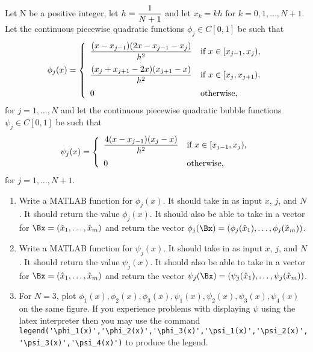
Let N be a positive integer, let $\displaystyle{h={1 \over N+1}}$ and let $x_k=kh$ for $k=0,1,\ldots,N+1$. Let the continuous piecewise quadratic functions $\phi_j\in C[0,1]$ be such that
\[
\phi_j(x)=\left\{\begin{array}{ll}
\displaystyle{{(x-x_{j-1})(2x-x_{j-1}-x_j) \over h^2}} & \displaystyle{\mbox{if }x\in[x_{j-1},x_j)},
\\[10pt]
\displaystyle{{(x_j+x_{j+1}-2x)(x_{j+1}-x) \over h^2}} & \displaystyle{\mbox{if }x\in[x_j,x_{j+1})},
\\[10pt]
0 & \mbox{otherwise},
\end{array}\right.
\]
for $j=1,\ldots,N$ and let the continuous piecewise quadratic bubble functions $\psi_j\in C[0,1]$ be such that
\[
\psi_j(x)=\left\{\begin{array}{ll}
\displaystyle{{4(x-x_{j-1})(x_j-x) \over h^2}} & \displaystyle{\mbox{if }x\in[x_{j-1},x_j)},
\\[10pt]
0 & \mbox{otherwise},
\end{array}\right.
\]
for $j=1,\ldots,N+1$.
\\
\begin{enumerate}
\item Write a MATLAB function for $\phi_j(x)$.  It should take in as input $x$, $j$, and $N$.  It should return the value $\phi_j(x)$.  It should also be able to take in a vector for $\Bx=(\hat{x}_1,\ldots,\hat{x}_m)$ and return the vector $\phi_j(\Bx)=(\phi_j(\hat{x}_1),\ldots,\phi_j(\hat{x}_m))$.
\\
\item Write a MATLAB function for $\psi_j(x)$.  It should take in as input $x$, $j$, and $N$.  It should return the value $\psi_j(x)$.  It should also be able to take in a vector for $\Bx=(\hat{x}_1,\ldots,\hat{x}_m)$ and return the vector $\psi_j(\Bx)=(\psi_j(\hat{x}_1),\ldots,\psi_j(\hat{x}_m))$.
\\
\item For $N=3$, plot $\phi_1(x),\phi_2(x), \phi_3(x),\psi_1(x),\psi_2(x), \psi_3(x),\psi_4(x)$ on the same figure. If you experience problems with displaying $\psi$ using the latex interpreter then you may use the command \verb|legend('\phi_1(x)','\phi_2(x)','\phi_3(x)','\psi_1(x)','\psi_2(x)','\psi_3(x)','\psi_4(x)')| to produce the legend.
\end{enumerate}





